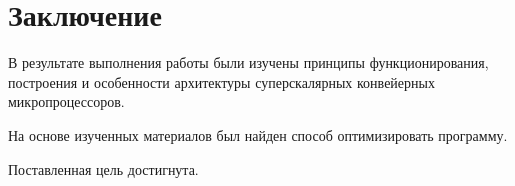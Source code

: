 \chapter{Заключение}

В результате выполнения работы были изучены принципы функционирования, построения и особенности
архитектуры суперскалярных конвейерных микропроцессоров.

На основе изученных материалов был найден способ оптимизировать программу.

Поставленная цель достигнута.